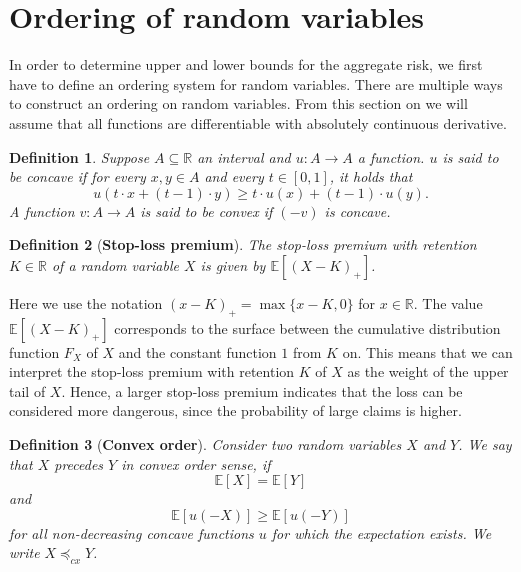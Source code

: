\documentclass{article}
\newtheorem{definition}{Definition}
\begin{document}
\section{Ordering of random variables}
In order to determine upper and lower bounds for the aggregate risk, we first have to define an ordering system for random variables. There are multiple ways to construct an ordering on random variables. From this section on we will assume that all functions are differentiable with absolutely continuous derivative.
\begin{definition}\cite[Definition 1.6.1]{Risk_Measurement}
    Suppose $A\subseteq \mathbb{R}$ an interval and $u: A\rightarrow A$ a function. $u$ is said to be concave if for every $x,y\in A$ and every $t\in [0,1]$, it holds that
    $$u(t \cdot x + (t-1) \cdot y) \geq t \cdot u(x) + (t-1) \cdot u(y).$$
    A function $v : A \rightarrow A$ is said to be convex if $(-v)$ is concave.
\end{definition}
\begin{definition}[\textbf{Stop-loss premium}]\cite[Definition 2.3.2]{Risk_Measurement}
   The stop-loss premium with retention $K\in \mathbb{R}$ of a random variable $X$ is given by $\mathbb{E}[(X-K)_+]$.
\end{definition}
Here we use the notation $(x-K)_+ = \max\{x-K,0\}$ for $x\in \mathbb{R}$. The value $\mathbb{E}[(X-K)_+]$ corresponds to the surface between the cumulative distribution function $F_X$ of $X$ and the constant function $1$ from $K$ on. This means that we can interpret the stop-loss premium with retention $K$ of $X$ as the weight of the upper tail of $X$. Hence, a larger stop-loss premium indicates that the loss can be considered more dangerous, since the probability of large claims is higher.
\begin{definition}[\textbf{Convex order}]\cite[Definition 2.5.1]{Risk_Measurement}
    Consider two random variables $X$ and $Y$. We say that $X$ precedes $Y$ in convex order sense, if 
    $$\mathbb{E}[X] = \mathbb{E}[Y]$$
    and 
    $$\mathbb{E}[u(-X)] \geq \mathbb{E}[u(-Y)]$$
    for all non-decreasing concave functions $u$ for which the expectation exists. We write $X\preceq_{cx}Y$.
\end{definition}
\end{document}
